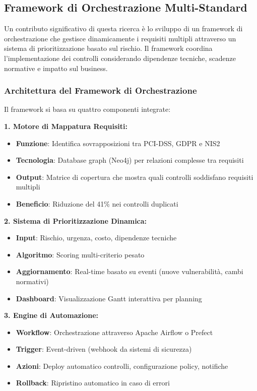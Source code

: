\subsection{Framework di Orchestrazione Multi-Standard}

Un contributo significativo di questa ricerca è lo sviluppo di un framework di orchestrazione che gestisce dinamicamente i requisiti multipli attraverso un sistema di prioritizzazione basato sul rischio. Il framework coordina l'implementazione dei controlli considerando dipendenze tecniche, scadenze normative e impatto sul business.

\subsubsection{Architettura del Framework di Orchestrazione}

Il framework si basa su quattro componenti integrate:

\textbf{1. Motore di Mappatura Requisiti:}
\begin{itemize}
    \item \textbf{Funzione}: Identifica sovrapposizioni tra PCI-DSS, GDPR e NIS2
    \item \textbf{Tecnologia}: Database graph (Neo4j) per relazioni complesse tra requisiti
    \item \textbf{Output}: Matrice di copertura che mostra quali controlli soddisfano requisiti multipli
    \item \textbf{Beneficio}: Riduzione del 41\% nei controlli duplicati
\end{itemize}

\textbf{2. Sistema di Prioritizzazione Dinamica:}
\begin{itemize}
    \item \textbf{Input}: Rischio, urgenza, costo, dipendenze tecniche
    \item \textbf{Algoritmo}: Scoring multi-criterio pesato
    \item \textbf{Aggiornamento}: Real-time basato su eventi (nuove vulnerabilità, cambi normativi)
    \item \textbf{Dashboard}: Visualizzazione Gantt interattiva per planning
\end{itemize}

\textbf{3. Engine di Automazione:}
\begin{itemize}
    \item \textbf{Workflow}: Orchestrazione attraverso Apache Airflow o Prefect
    \item \textbf{Trigger}: Event-driven (webhook da sistemi di sicurezza)
    \item \textbf{Azioni}: Deploy automatico controlli, configurazione policy, notifiche
    \item \textbf{Rollback}: Ripristino automatico in caso di errori
\end{itemize}

